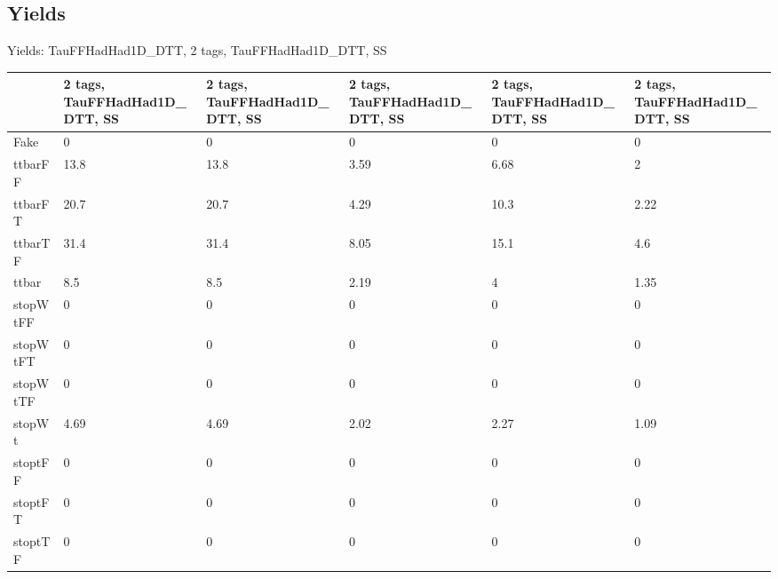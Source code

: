 
\subsection{Yields}

\begin{frame}{Yields: TauFFHadHad1D\_DTT, 2 tags, TauFFHadHad1D\_DTT, SS}
\begin{center}
  \begin{tabular}{l| >{\centering\let\newline\\\arraybackslash\hspace{0pt}}m{1.4cm}| >{\centering\let\newline\\\arraybackslash\hspace{0pt}}m{1.4cm}| >{\centering\let\newline\\\arraybackslash\hspace{0pt}}m{1.4cm}| >{\centering\let\newline\\\arraybackslash\hspace{0pt}}m{1.4cm}| >{\centering\let\newline\\\arraybackslash\hspace{0pt}}m{1.4cm}}
    & 2 tags, TauFFHadHad1D\_DTT, SS & 2 tags, TauFFHadHad1D\_DTT, SS & 2 tags, TauFFHadHad1D\_DTT, SS & 2 tags, TauFFHadHad1D\_DTT, SS & 2 tags, TauFFHadHad1D\_DTT, SS \\
 \hline \hline
    Fake& 0 & 0 & 0 & 0 & 0 \\
 \hline
    ttbarFF& 13.8 & 13.8 & 3.59 & 6.68 & 2 \\
 \hline
    ttbarFT& 20.7 & 20.7 & 4.29 & 10.3 & 2.22 \\
 \hline
    ttbarTF& 31.4 & 31.4 & 8.05 & 15.1 & 4.6 \\
 \hline
    ttbar& 8.5 & 8.5 & 2.19 & 4 & 1.35 \\
 \hline
    stopWtFF& 0 & 0 & 0 & 0 & 0 \\
 \hline
    stopWtFT& 0 & 0 & 0 & 0 & 0 \\
 \hline
    stopWtTF& 0 & 0 & 0 & 0 & 0 \\
 \hline
    stopWt& 4.69 & 4.69 & 2.02 & 2.27 & 1.09 \\
 \hline
    stoptFF& 0 & 0 & 0 & 0 & 0 \\
 \hline
    stoptFT& 0 & 0 & 0 & 0 & 0 \\
 \hline
    stoptTF& 0 & 0 & 0 & 0 & 0 \\

\end{tabular}
\end{center}
\end{frame}
